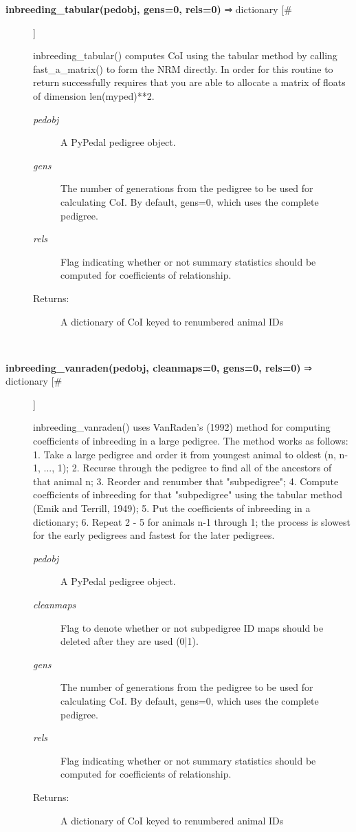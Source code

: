 \begin{description}
\item[\textbf{inbreeding\_tabular(pedobj, gens=0, rels=0)} ⇒ dictionary [\#]
]
\par inbreeding\_tabular() computes CoI using the tabular method by calling
fast\_a\_matrix() to form the NRM directly.  In order for this routine
to return successfully requires that you are able to allocate a matrix
of floats of dimension len(myped)**2.
\begin{description}
\item[\textit{pedobj}
]
A PyPedal pedigree object.
\item[\textit{gens}
]
The number of generations from the pedigree to be used for calculating CoI.  By default, gens=0, which uses the complete pedigree.
\item[\textit{rels}
]
Flag indicating whether or not summary statistics should be computed for coefficients of relationship.
\item[Returns:
]
A dictionary of CoI keyed to renumbered animal IDs
\end{description}\\

\item[\textbf{inbreeding\_vanraden(pedobj, cleanmaps=0, gens=0, rels=0)} ⇒ dictionary [\#]
]
\par inbreeding\_vanraden() uses VanRaden's (1992) method for computing coefficients of
inbreeding in a large pedigree.  The method works as follows:
  1.  Take a large pedigree and order it from youngest animal to oldest (n, n-1, ..., 1);
  2.  Recurse through the pedigree to find all of the ancestors of that animal n;
  3.  Reorder and renumber that "subpedigree";
  4.  Compute coefficients of inbreeding for that "subpedigree" using the tabular
      method (Emik and Terrill, 1949);
  5.  Put the coefficients of inbreeding in a dictionary;
  6.  Repeat 2 - 5 for animals n-1 through 1; the process is slowest for the early
      pedigrees and fastest for the later pedigrees.
\begin{description}
\item[\textit{pedobj}
]
A PyPedal pedigree object.
\item[\textit{cleanmaps}
]
Flag to denote whether or not subpedigree ID maps should be deleted after they are used (0|1).
\item[\textit{gens}
]
The number of generations from the pedigree to be used for calculating CoI.  By default, gens=0, which uses the complete pedigree.
\item[\textit{rels}
]
Flag indicating whether or not summary statistics should be computed for coefficients of relationship.
\item[Returns:
]
A dictionary of CoI keyed to renumbered animal IDs
\end{description}\\


\end{description}
